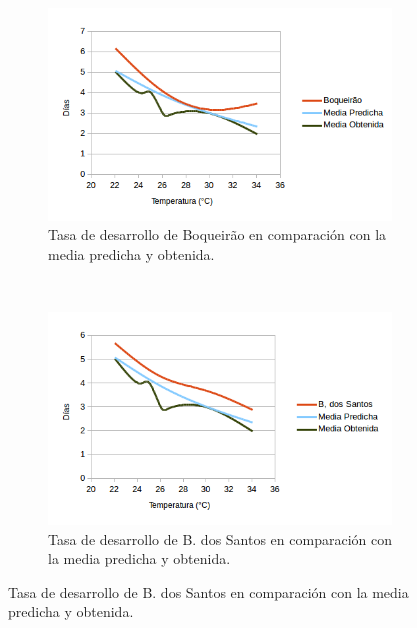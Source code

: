 \begin{figure}[!htbp]
    \centering
    \begin{subfigure}[b]{0.45\textwidth}
            \includegraphics[width=\textwidth]{capitulo-6/graphics/desarrollo-huevos-1.png}
            \caption{Tasa de desarrollo de Boqueirão en comparación con la media predicha y obtenida.}
    \end{subfigure}
    ~~~~
    \begin{subfigure}[b]{0.45\textwidth}
            \includegraphics[width=\textwidth]{capitulo-6/graphics/desarrollo-huevos-2.png}
            \caption{Tasa de desarrollo de B. dos Santos en comparación con la media predicha y obtenida.}


\end{subfigure}
\end{figure}
